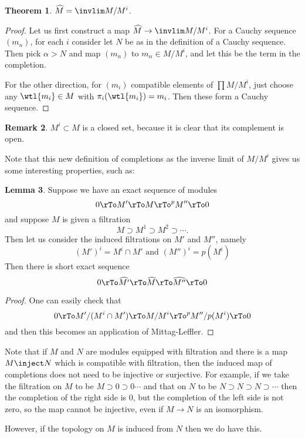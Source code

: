 \documentclass[12 pt]{article}
\theoremstyle{definition}
\newtheorem{thm}{Theorem}[section]
\newtheorem{lemma}[thm]{Lemma}
\newtheorem{rmk}[thm]{Remark}
\renewcommand{\(}{\left(}
\renewcommand{\)}{\right)}
\begin{document}
\begin{thm} $\widehat{M}=\invlim M/M^i$.
\end{thm}
\begin{proof} Let us first construct a map $\widehat{M} \to \invlim M/M^i$. For a Cauchy sequence $(m_n)$, for each $i$ consider let $N$ be as in the definition of a Cauchy sequence. Then pick $\alpha>N$ and map $(m_n)$ to $m_\alpha \in M/M^i$, and let this be the term in the completion.

For the other direction, for $(m_i)$ compatible elements of $\prod M/M^i$, just choose any $\wtl{m_i} \in M$ with $\pi_i(\wtl{m_i})=m_i$. Then these form a Cauchy sequence.
\end{proof}

\begin{rmk} $M^i \subset M$ is a closed set, because it is clear that its complement is open.
\end{rmk}

Note that this new definition of completions as the inverse limit of $M/M^i$ gives us some interesting properties, such as:
\begin{lemma} Suppose we have an exact sequence of modules
\[0 \rTo M' \rTo M \rTo^p M'' \rTo 0\]
and suppose $M$ is given a filtration
\[M \supset M^1 \supset M^2 \supset \cdots.\]
Then let us consider the induced filtrations on $M'$ and $M''$, namely
\[(M')^i=M^i \cap M' \text{ and } (M'')^i=p(M^i)\]
Then there is short exact sequence
\[0 \rTo \widehat{M'} \rTo \widehat{M} \rTo \widehat{M''} \rTo 0\]
\label{hat exact}
\end{lemma}
\begin{proof}
One can easily check that
\[0 \rTo M'/(M^i \cap M') \rTo M/M^i \rTo^p M''/p(M^i) \rTo 0\]
and then this becomes an application of Mittag-Leffler.
\end{proof}

Note that if $M$ and $N$ are modules equipped with filtration and there is a map $M \inject N$ which is compatible with filtration, then the induced map of completions does not need to be injective or surjective. For example, if we take the filtration on $M$ to be $M \supset 0 \supset 0 \cdots$ and that on $N$ to be $N \supset N \supset N \supset \cdots$ then the completion of the right side is 0, but the completion of the left side is not zero, so the map cannot be injective, even if $M \to N$ is an isomorphism.

However, if the topology on $M$ is induced from $N$ then we do have this.
\end{document}
